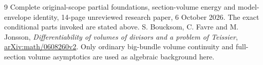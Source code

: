 \documentclass[11pt]{article}
\begin{document}
\begin{thebibliography}{9}\small
{} Complete original-scope partial foundations, section-volume
energy and model-envelope identity, 14-page unreviewed research paper,
6 October 2026. The exact conditional parts invoked are stated above.
 S. Boucksom, C. Favre and M. Jonsson,
\emph{Differentiability of volumes of divisors and a problem of Teissier},
\href{https://arxiv.org/html/math/0608260v2}{arXiv:math/0608260v2}.
Only ordinary big-bundle volume continuity and full-section volume
asymptotics are used as algebraic background here.
\end{thebibliography}
\end{document}
